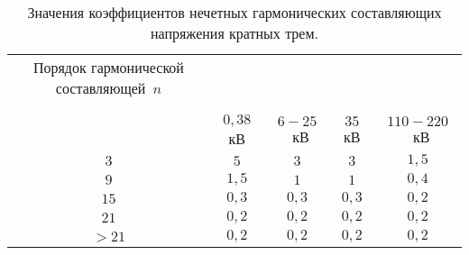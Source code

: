 \begin{table} [p]%
	\caption{Значения коэффициентов нечетных гармонических  составляющих напряжения кратных трем.}%
	\label{tbl:test3}%
	\begin{SingleSpace}
		\setlength\extrarowheight{6pt} %
		\setlength{\tymin}{1.9cm}%
		\begin{tabulary}{\textwidth}{@{}>{\zz}C >{\zz}C >{\zz}C >{\zz}C >{\zz}C @{}}%
			\toprule     %
			Порядок гармонической составляющей~$n$ & 
			  \\
			&
			\\		
			&
			 \\			
			&
			$0,38$ кВ &
			$6-25$~кВ &
			$35$ кВ  &
			$110-220$~кВ \\
			\midrule %
			$3$ &
			$5$ &
			$3$ &
			$3$ &
			$1,5$ \\
			
			$9$ &
			$1,5$ &
			$1$ &
			$1$&
			$0,4$ \\
			
			$15$ &
			$0,3$ &
			$0,3$ &
			$0,3$ &
			$0,2$ \\
			
			$21$ &
			$0,2$ &
			$0,2$ &
			$0,2$ &
			$0,2$\\
			
			
			$>21$ &
			$0,2$ &
			$0,2$ &
			$0,2$ &
			$0,2$\\
			
			\bottomrule %
		\end{tabulary}%
	\end{SingleSpace}
\end{table}

